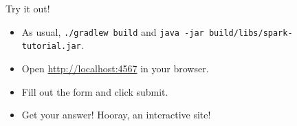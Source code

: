 \begin{frame}{Try it out!}
\begin{itemize}
    \item As usual, \texttt{./gradlew build} and \texttt{java -jar build/libs/spark-tutorial.jar}.
    \item Open \url{http://localhost:4567} in your browser.
    \item Fill out the form and click submit.
    \item Get your answer! Hooray, an interactive site!
\end{itemize}
\end{frame}